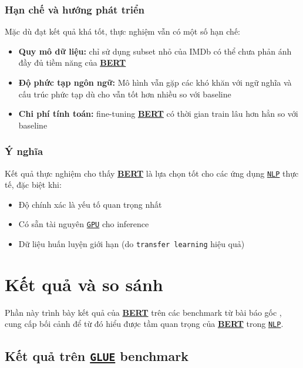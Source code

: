 \subsubsection{Hạn chế và hướng phát triển}
Mặc dù đạt kết quả khá tốt, thực nghiệm vẫn có một số hạn chế:
\begin{itemize}
    \item \textbf{Quy mô dữ liệu:} chỉ sử dụng subset nhỏ của IMDb có thể chưa phản ánh đầy đủ tiềm năng của \hyperref[acro:bert]{\textbf{BERT}}
    \item \textbf{Độ phức tạp ngôn ngữ:} Mô hình vẫn gặp các khó khăn với ngữ nghĩa và cấu trúc phức tạp dù cho vẫn tốt hơn nhiều so với baseline
    \item \textbf{Chi phí tính toán:} fine-tuning \hyperref[acro:bert]{\textbf{BERT}} có thời gian train lâu hơn hẳn so với baseline
\end{itemize}

\subsubsection{Ý nghĩa}
Kết quả thực nghiệm cho thấy \hyperref[acro:bert]{\textbf{BERT}} là lựa chọn tốt cho các ứng dụng \hyperref[acro:nlp]{\texttt{NLP}} thực tế, đặc biệt khi:
\begin{itemize}
    \item Độ chính xác là yếu tố quan trọng nhất
    \item Có sẵn tài nguyên \hyperref[acro:gpu]{\texttt{GPU}} cho inference
    \item Dữ liệu huấn luyện giới hạn (do \texttt{transfer learning} hiệu quả)
\end{itemize}

\section{Kết quả và so sánh}
\label{sec:ket_qua_so_sanh}

Phần này trình bày kết quả của \hyperref[acro:bert]{\textbf{BERT}} trên các benchmark từ bài báo gốc \cite{devlin2018bert}, cung cấp bối cảnh để từ đó hiểu được tầm quan trọng của \hyperref[acro:bert]{\textbf{BERT}} trong \hyperref[acro:nlp]{\texttt{NLP}}.

\subsection{Kết quả trên \hyperref[acro:glue]{\texttt{GLUE}} benchmark}
\label{ssec:ket_qua_glue}

